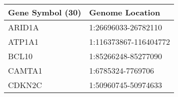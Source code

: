 \begin{tabular}{ll}
\toprule
Gene Symbol (30) &       Genome Location \\
\midrule
          ARID1A &   1:26696033-26782110 \\
          ATP1A1 & 1:116373867-116404772 \\
           BCL10 &   1:85266248-85277090 \\
          CAMTA1 &     1:6785324-7769706 \\
          CDKN2C &   1:50960745-50974633 \\
\bottomrule
\end{tabular}
